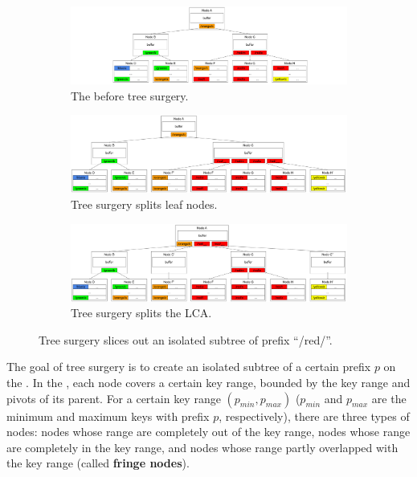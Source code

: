 \begin{figure}
    \begin{subfigure}{\textwidth}
        \centering
        \includegraphics[width=.9\linewidth]{fig/slice-1}
        \caption{\label{subfig:slice-1} The \bet before tree surgery.}
    \end{subfigure}
    \begin{subfigure}{\textwidth}
        \centering
        \includegraphics[width=.9\linewidth]{fig/slice-2}
        \caption{\label{subfig:slice-2} Tree surgery splits leaf nodes.}
    \end{subfigure}
    \begin{subfigure}{\textwidth}
        \centering
        \includegraphics[width=.9\linewidth]{fig/slice-3}
        \caption{\label{subfig:slice-3} Tree surgery splits the LCA.}
    \end{subfigure}
    \caption[Tree surgery example]{\label{fig:slice}
        Tree surgery slices out an isolated subtree of prefix ``/red/''.}
\end{figure}

The goal of tree surgery is to create an isolated subtree of a certain
prefix $p$ on the \bet.
In the \bet, each node covers a certain key range, bounded by the key range and
pivots of its parent.
For a certain key range $(p_{min}, p_{max})$ ($p_{min}$ and $p_{max}$ are the
minimum and maximum keys with prefix $p$, respectively), there are three types
of nodes: nodes whose range are completely out of the key range, nodes whose
range are completely in the key range, and nodes whose range partly overlapped
with the key range (called \textbf{fringe nodes}).


